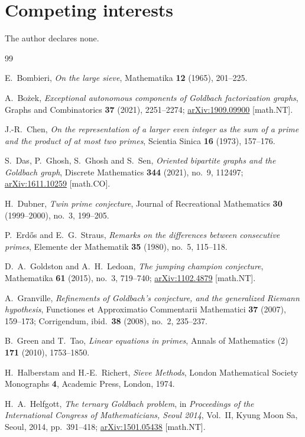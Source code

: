 \documentclass[11pt]{article}
\theoremstyle{plain}
\theoremstyle{definition}
\begin{document}
\section*{Competing interests}
The author declares none.

\begin{thebibliography}{99}

E.~Bombieri, \emph{On the large sieve}, Mathematika \textbf{12}
(1965), 201--225.

A.~Bo\.zek, \emph{Exceptional autonomous components of Goldbach
factorization graphs}, Graphs and Combinatorics \textbf{37}
(2021), 2251--2274; \href{https://arxiv.org/abs/1909.09900}{arXiv:1909.09900}
[math.NT].

J.-R.~Chen, \emph{On the representation of a larger even integer
as the sum of a prime and the product of at most two primes},
Scientia Sinica \textbf{16} (1973), 157--176.

S.~Das, P.~Ghosh, S.~Ghosh and S.~Sen, \emph{Oriented bipartite
graphs and the Goldbach graph}, Discrete Mathematics
\textbf{344} (2021), no.~9, 112497;
\href{https://arxiv.org/abs/1611.10259}{arXiv:1611.10259} [math.CO].

H.~Dubner, \emph{Twin prime conjecture}, Journal of Recreational
Mathematics \textbf{30} (1999--2000), no.~3, 199--205.

P.~Erd\H{o}s and E.~G.~Straus, \emph{Remarks on the differences
between consecutive primes}, Elemente der Mathematik \textbf{35}
(1980), no.~5, 115--118.

D.~A.~Goldston and A.~H.~Ledoan, \emph{The jumping champion
conjecture}, Mathematika \textbf{61} (2015), no.~3, 719--740;
\href{https://arxiv.org/abs/1102.4879}{arXiv:1102.4879} [math.NT].

A.~Granville, \emph{Refinements of Goldbach's conjecture, and the
generalized Riemann hypothesis}, Functiones et Approximatio
Commentarii Mathematici \textbf{37} (2007), 159--173; Corrigendum,
ibid.\ \textbf{38} (2008), no.~2, 235--237.

B.~Green and T.~Tao, \emph{Linear equations in primes}, Annals
of Mathematics (2) \textbf{171} (2010), 1753--1850.

H.~Halberstam and H.-E.~Richert, \emph{Sieve Methods},
London Mathematical Society Monographs \textbf{4}, Academic Press,
London, 1974.

H.~A.~Helfgott, \emph{The ternary Goldbach problem}, in
\emph{Proceedings of the International Congress of
Mathematicians, Seoul 2014}, Vol.~II, Kyung Moon Sa, Seoul, 2014,
pp.~391--418; \href{https://arxiv.org/abs/1501.05438}{arXiv:1501.05438}
[math.NT].


\end{thebibliography}
\end{document}
